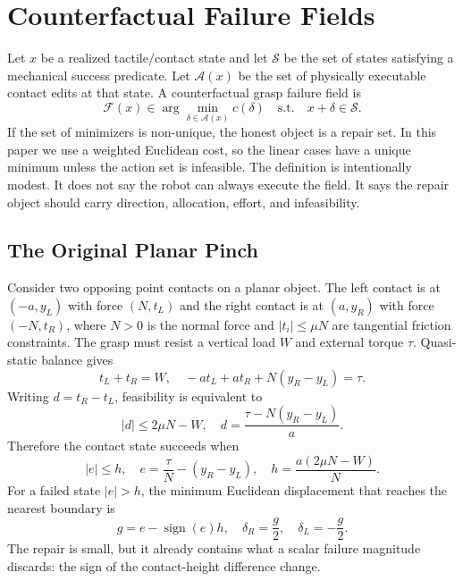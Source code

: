 \documentclass{article}
\newcommand{\field}{\mathcal{F}}
\newcommand{\success}{\mathcal{S}}
\newcommand{\actions}{\mathcal{A}}
\newcommand{\cost}{c}
\newcommand{\state}{x}
\newcommand{\edit}{\delta}
\begin{document}
\section{Counterfactual Failure Fields}

Let $\state$ be a realized tactile/contact state and let $\success$ be the set of states satisfying a mechanical success predicate. Let $\actions(\state)$ be the set of physically executable contact edits at that state. A counterfactual grasp failure field is
\begin{equation}
    \field(\state) \in
    \arg\min_{\edit \in \actions(\state)}
    \cost(\edit)
    \quad
    \mathrm{s.t.}
    \quad
    \state+\edit \in \success.
    \label{eq:field}
\end{equation}
If the set of minimizers is non-unique, the honest object is a repair set. In this paper we use a weighted Euclidean cost, so the linear cases have a unique minimum unless the action set is infeasible. The definition is intentionally modest. It does not say the robot can always execute the field. It says the repair object should carry direction, allocation, effort, and infeasibility.

\subsection{The Original Planar Pinch}

Consider two opposing point contacts on a planar object. The left contact is at $(-a,y_L)$ with force $(N,t_L)$ and the right contact is at $(a,y_R)$ with force $(-N,t_R)$, where $N>0$ is the normal force and $|t_i|\leq \mu N$ are tangential friction constraints. The grasp must resist a vertical load $W$ and external torque $\tau$. Quasi-static balance gives
\begin{equation}
    t_L+t_R=W,
    \quad
    -a t_L + a t_R + N(y_R-y_L)=\tau .
\end{equation}
Writing $d=t_R-t_L$, feasibility is equivalent to
\begin{equation}
    |d|\leq 2\mu N-W,
    \quad
    d=\frac{\tau-N(y_R-y_L)}{a}.
\end{equation}
Therefore the contact state succeeds when
\begin{equation}
    |e|\leq h,
    \quad
    e=\frac{\tau}{N}-(y_R-y_L),
    \quad
    h=\frac{a(2\mu N-W)}{N}.
    \label{eq:interval}
\end{equation}
For a failed state $|e|>h$, the minimum Euclidean displacement that reaches the nearest boundary is
\begin{equation}
    g=e-\operatorname{sign}(e)h,
    \quad
    \delta_R=\frac{g}{2},
    \quad
    \delta_L=-\frac{g}{2}.
    \label{eq:closedform}
\end{equation}
The repair is small, but it already contains what a scalar failure magnitude discards: the sign of the contact-height difference change.
\end{document}
